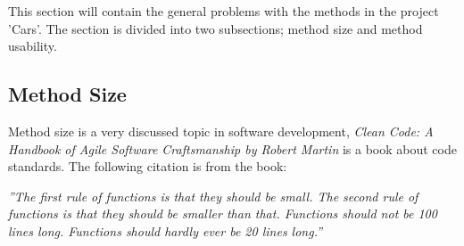 This section will contain the general problems with the methods in the project 'Cars'.
The section is divided into two subsections; method size and method usability.
\subsection{Method Size}
Method size is a very discussed topic in software development, \textit{Clean Code: A Handbook of Agile Software Craftsmanship by Robert Martin} is a book about code standards.
The following citation is from the book:
\begin{center}
\textit{''The first rule of functions is that they should be small. The second rule of functions is that they should be smaller than that. Functions should not be 100 lines long. Functions should hardly ever be 20 lines long.''} \cite{clean_code}
\end{center}